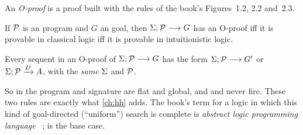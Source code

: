 \begin{definition}
An \emph{O-proof} is a proof built with the rules of the book's Figures~1.2, 2.2 and~2.3.
\end{definition}
\begin{theorem}\label{thm:horn-oproof}
If $\mathcal{P}$ is an \fohc{} program and $G$ an \fohc{} goal, then $\Sigma;\mathcal{P}\longrightarrow G$ has an O-proof iff it is
provable in classical logic iff it is provable in intuitionistic logic.
\end{theorem}
\begin{proposition}\label{prop:horn-flat}
Every sequent in an O-proof of $\Sigma;\mathcal{P}\longrightarrow G$ has the form $\Sigma;\mathcal{P}\longrightarrow G'$ or
$\Sigma;\mathcal{P}\xrightarrow{D}A$, with the \emph{same} $\Sigma$ and $\mathcal{P}$.
\end{proposition}
So in \fohc{} the program and signature are flat and global, and  and 
never fire. These two rules are exactly what \cref{ch:hh} adds. The book's term for a logic in which this
kind of goal-directed (``uniform'') search is complete is \emph{abstract logic programming
language}~\cite{MillerNadathurPfenningScedrov1991,MillerNadathur2012} ; \fohc{} is the base case.

